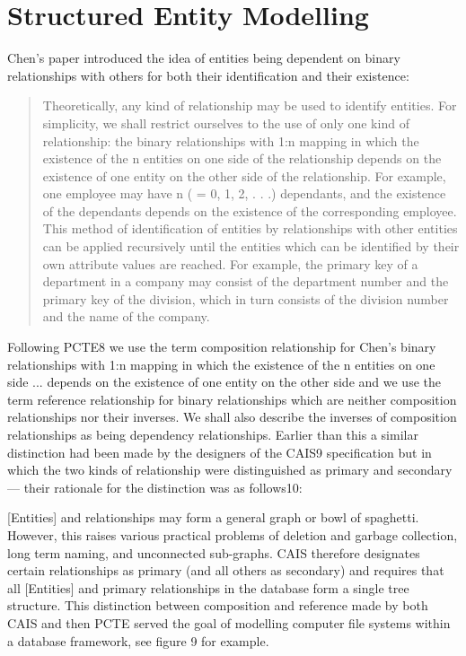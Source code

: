 \section{Structured Entity Modelling}
Chen's paper introduced the idea of entities being dependent on binary relationships with others for both their identification and their existence:
\begin{quote}
Theoretically, any kind of relationship may be used to identify entities. For simplicity, we shall restrict ourselves to the use of only one kind of relationship: the binary relationships with 1:n mapping in which the existence of the n entities on one side of the relationship depends on the existence of one entity on the other side of the relationship. For example, one employee may have n ( = 0, 1, 2, . . .) dependants, and the existence of the dependants depends on the existence of the corresponding employee. This method of identification of entities by relationships with other entities can be applied recursively until the entities which can be identified by their own attribute values are reached. For example, the primary key of a department in a company may consist of the department number and the primary key of the division, which in turn consists of the division number and the name of the company.
\end{quote}

Following PCTE8 we use the term composition relationship for Chen's binary relationships with 1:n mapping in which the existence of the n entities on one side ... depends on the existence of one entity on the other side and we use the term reference relationship for binary relationships which are neither composition relationships nor their inverses. We shall also describe the inverses of composition relationships as being dependency relationships. Earlier than this a similar distinction had been made by the designers of the CAIS9 specification but in which the two kinds of relationship were distinguished as primary and secondary — their rationale for the distinction was as follows10:

[Entities] and relationships may form a general graph or bowl of spaghetti. However, this raises various practical problems of deletion and garbage collection, long term naming, and unconnected sub-graphs. CAIS therefore designates certain relationships as primary (and all others as secondary) and requires that all [Entities] and primary relationships in the database form a single tree structure.
This distinction between composition and reference made by both CAIS and then PCTE served the goal of modelling computer file systems within a database framework, see figure 9 for example.

